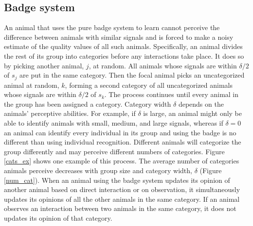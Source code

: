 \subsection{Badge system }
An animal that uses the pure badge system to learn cannot perceive the difference between animals with similar signals and is forced to make a noisy estimate of the quality values of all such animals. Specifically, an animal divides the rest of its group into categories before any interactions take place. It does so by picking another animal, $j$, at random. All animals whose signals are within $\delta/2$ of $s_j$ are put in the same category. Then the focal animal picks an uncategorized animal at random, $k$, forming a second category of all uncategorized animals whose signals are within $\delta/2$ of $s_k$. The process continues until every animal in the group has been assigned a category. Category width $\delta$ depends on the animals' perceptive abilities. For example, if $\delta$ is large, an animal might only be able to identify animals with small, medium, and large signals, whereas if $\delta=0$ an animal can identify every individual in its group and using the badge is no different than using individual recognition. Different animals will categorize the group differently and may perceive different numbers of categories. Figure \ref{cats_ex} shows one example of this process. 
The average number of categories  animals perceive decreases with group size and category width, $\delta$ (Figure \ref{num_cat}). When an animal using the badge system updates its opinion of another animal based on direct interaction or on observation, it simultaneously updates its opinions of all the other animals in the same category. If an animal observes an interaction between two animals in the same category, it does not updates its opinion of that category.

